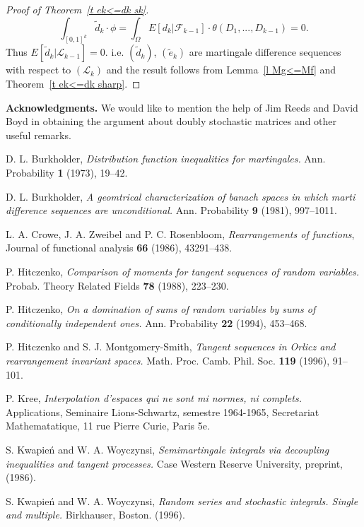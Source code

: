 \documentclass[12pt]{amsart}
\begin{document}
\begin{proof}[Proof of Theorem~\ref{t ek<=dk sk}]
\[\int_{[0,1]^k} \widetilde{d}_k \cdot\phi= \int_\Omega E[d_k|\mathcal{F}_{k-1}] \cdot
\theta(D_1,...,D_{k-1})=0.\] Thus
$E[\widetilde{d}_k|\mathcal{L}_{k-1}]=0$. i.e.
$(\widetilde{d}_k)$, $(\widetilde{e}_k)$ are martingale difference
sequences with respect to $(\mathcal{L}_{k})$ and the result
follows from Lemma~\ref{l Mg<=Mf} and Theorem~\ref{t ek<=dk sharp}.
\end{proof}

{\bf Acknowledgments.} We would like to mention the help of Jim
Reeds and David Boyd in obtaining the argument about doubly
stochastic matrices and other useful remarks.


\begin{thebibliography}{10}
 D. L. Burkholder, \textit{Distribution function inequalities for martingales.} Ann.
Probability \textbf{1} (1973), 19--42.

 D. L. Burkholder, \textit{A geomtrical characterization of banach spaces in which
marti difference sequences are unconditional.} Ann. Probability
\textbf{9} (1981), 997--1011.

 L. A. Crowe, J. A. Zweibel and P. C. Rosenbloom, \textit{Rearrangements of functions},
Journal of functional analysis \textbf{66} (1986), 43291--438.

 P. Hitczenko, \textit{Comparison of moments for tangent sequences of random variables.}
Probab. Theory Related Fields \textbf{78} (1988), 223--230.

 P. Hitczenko, \textit{On a domination of sums of random variables by sums of conditionally
independent ones.} Ann. Probability \textbf{22} (1994), 453--468.

 P. Hitczenko and S. J. Montgomery-Smith, \textit{Tangent sequences in Orlicz and
rearrangement invariant spaces.} Math. Proc. Camb. Phil. Soc.
\textbf{119} (1996), 91--101.

 P. Kree, \textit{Interpolation d'espaces qui ne sont mi normes, ni complets.} Applications,
Seminaire Lions-Schwartz, semestre 1964-1965, Secretariat Mathematatique, 11 rue Pierre Curie, Paris 5e.

 S. Kwapie\'n and W. A. Woyczynsi, \textit{Semimartingale integrals
via decoupling inequalities and tangent processes.} Case Western Reserve University, preprint, (1986).

 S. Kwapie\'n and W. A. Woyczynsi, \textit{Random series and stochastic integrals. Single and
 multiple.} Birkhauser, Boston. (1996).


\end{thebibliography}
\end{document}
